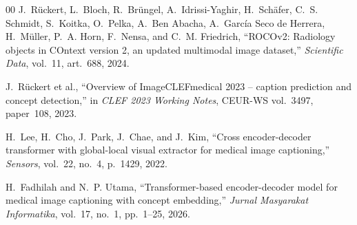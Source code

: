\begin{thebibliography}{00}
J.~Rückert, L.~Bloch, R.~Brüngel, A.~Idrissi-Yaghir, H.~Schäfer, C.~S. Schmidt, S.~Koitka, O.~Pelka, A.~Ben Abacha, A.~García Seco de Herrera, H.~Müller, P.~A. Horn, F.~Nensa, and C.~M. Friedrich, ``ROCOv2: Radiology objects in COntext version 2, an updated multimodal image dataset,'' \emph{Scientific Data}, vol.~11, art.~688, 2024.

J.~Rückert et al., ``Overview of ImageCLEFmedical 2023 -- caption prediction and concept detection,'' in \emph{CLEF 2023 Working Notes}, CEUR-WS vol.~3497, paper~108, 2023.

H.~Lee, H.~Cho, J.~Park, J.~Chae, and J.~Kim, ``Cross encoder-decoder transformer with global-local visual extractor for medical image captioning,'' \emph{Sensors}, vol.~22, no.~4, p.~1429, 2022.

H.~Fadhilah and N.~P. Utama, ``Transformer-based encoder-decoder model for medical image captioning with concept embedding,'' \emph{Jurnal Masyarakat Informatika}, vol.~17, no.~1, pp.~1--25, 2026.

\end{thebibliography}

